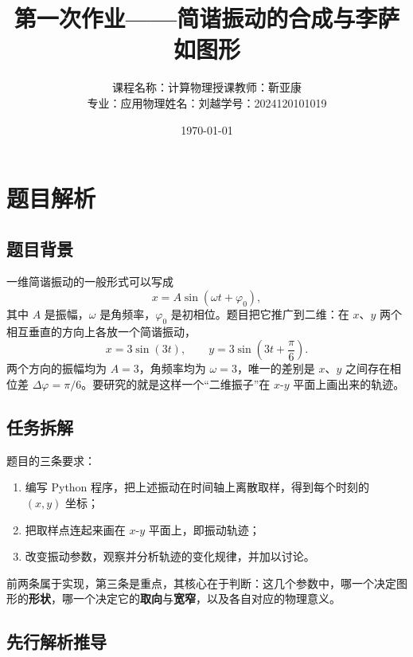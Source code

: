 \documentclass[UTF8,a4paper,12pt]{ctexart}
\title{第一次作业——简谐振动的合成与李萨如图形}
\author{课程名称：计算物理\quad 授课教师：靳亚康\\[0.2em]专业：应用物理\quad 姓名：刘越\quad 学号：2024120101019}
\date{\today}
\begin{document}
\maketitle

\section{题目解析}

\subsection{题目背景}

一维简谐振动的一般形式可以写成
\begin{equation}
  x = A\sin(\omega t + \varphi_0),
\end{equation}
其中 $A$ 是振幅，$\omega$ 是角频率，$\varphi_0$ 是初相位。题目把它推广到二维：在 $x$、$y$ 两个相互垂直的方向上各放一个简谐振动，
\begin{equation}
  x = 3\sin(3t),\qquad y = 3\sin\!\left(3t + \frac{\pi}{6}\right).
\end{equation}
两个方向的振幅均为 $A=3$，角频率均为 $\omega=3$，唯一的差别是 $x$、$y$ 之间存在相位差 $\Delta\varphi=\pi/6$。要研究的就是这样一个“二维振子”在 $x$-$y$ 平面上画出来的轨迹。

\subsection{任务拆解}

题目的三条要求：

\begin{enumerate}
  \item 编写 Python 程序，把上述振动在时间轴上离散取样，得到每个时刻的 $(x,y)$ 坐标；
  \item 把取样点连起来画在 $x$-$y$ 平面上，即振动轨迹；
  \item 改变振动参数，观察并分析轨迹的变化规律，并加以讨论。
\end{enumerate}

前两条属于实现，第三条是重点，其核心在于判断：这几个参数中，哪一个决定图形的\textbf{形状}，哪一个决定它的\textbf{取向}与\textbf{宽窄}，以及各自对应的物理意义。

\subsection{先行解析推导}
\end{document}
